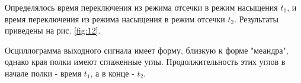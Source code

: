 Определялось время переключения из режима отсечки в режим насыщения $t_1$, и время переключения из режима насыщения в
режим отсечки $t_2$. Результаты приведены на рис. \ref{fig:12}.

Осциллограмма выходного сигнала имеет форму, близкую к форме "меандра", однако края полки имеют сглаженные углы.
Продолжительность этих углов в начале полки - время $t_1$, а в конце - $t_2$. 



